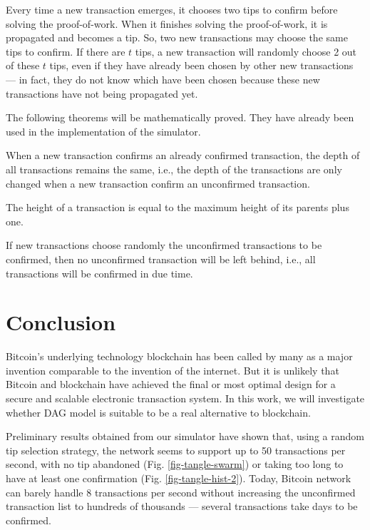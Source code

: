 Every time a new transaction emerges, it chooses two tips to confirm before solving the proof-of-work. When it finishes solving the proof-of-work, it is propagated and becomes a tip. So, two new transactions may choose the same tips to confirm. If there are $t$ tips, a new transaction will randomly choose 2 out of these $t$ tips, even if they have already been chosen by other new transactions --- in fact, they do not know which have been chosen because these new transactions have not being propagated yet.

The following theorems will be mathematically proved. They have already been used in the implementation of the simulator.

\begin{theorem}
\label{theorem-new-tx-not-tip}
When a new transaction confirms an already confirmed transaction, the depth of all transactions remains the same, i.e., the depth of the transactions are only changed when a new transaction confirm an unconfirmed transaction.
\end{theorem}

\begin{theorem}
The height of a transaction is equal to the maximum height of its parents plus one.
\end{theorem}

\begin{theorem}
If new transactions choose randomly the unconfirmed transactions to be confirmed, then no unconfirmed transaction will be left behind, i.e., all transactions will be confirmed in due time.
\end{theorem}

\chapter{Conclusion}

Bitcoin's underlying technology blockchain has been called by many as a major invention comparable to the invention of the internet. But it is unlikely that Bitcoin and blockchain have achieved the final or most optimal design for a secure and scalable electronic transaction system. In this work, we will investigate whether DAG model is suitable to be a real alternative to blockchain.

Preliminary results obtained from our simulator have shown that, using a random tip selection strategy, the network seems to support up to 50 transactions per second, with no tip abandoned (Fig. \ref{fig-tangle-swarm}) or taking too long to have at least one confirmation (Fig. \ref{fig-tangle-hist-2}). Today, Bitcoin network can barely handle 8 transactions per second without increasing the unconfirmed transaction list to hundreds of thousands --- several transactions take days to be confirmed.

